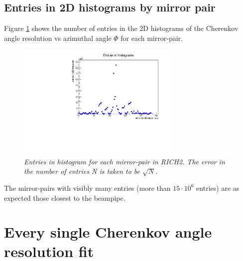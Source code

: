 \subsection{Entries in 2D histograms by mirror pair}
Figure \ref{fig:rich2entries} shows the number of entries in the 2D histograms of the Cherenkov angle resolution vs azimuthal angle $\Phi$ for each mirror-pair.\\
\begin{figure}[!h]
\begin{center}
\includegraphics[width= 0.7\textwidth] {entries_rich2.pdf}
\end{center}
\caption{\textit{Entries in histogram for each mirror-pair in RICH2. The error in the number of entries N is taken to be $\sqrt{N}$.}}
\label{fig:rich2entries}
\end{figure}
The mirror-pairs with visibly many entries (more than $15 \cdot 10^{6}$ entries) are as expected those closest to the beampipe.\\



\section{Every single Cherenkov angle resolution fit}
